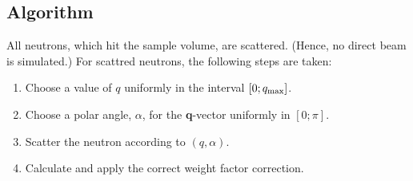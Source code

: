 \subsection{Algorithm}
All neutrons, which hit the sample volume, are scattered.
(Hence, no direct beam is simulated.)
For scattred neutrons, the following steps are taken:
\begin{enumerate}
\item Choose a value of $q$ uniformly in the interval $[0;q_{\rm max}]$.
\item Choose a polar angle, $\alpha$,
  for the {\bf q}-vector uniformly in $[0;\pi]$.
\item Scatter the neutron according to $(q,\alpha)$.
\item Calculate and apply the correct weight factor correction.
\end{enumerate}
